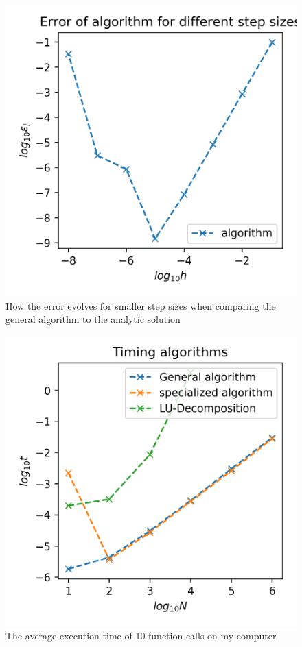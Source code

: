 \documentclass[10pt,showpacs,preprintnumbers,footinbib,amsmath,amssymb,aps,prl,twocolumn,groupedaddress,superscriptaddress,showkeys]{revtex4-1}
\begin{document}
  \begin{figure}[h!]
    \center
    \includegraphics[scale=.7]{figs/ex1e_err.png}
    \caption{How the error evolves for smaller step sizes when comparing the general algorithm to the analytic solution}
    \label{fig:error}
  \end{figure}

  \newpage

  \begin{figure}[h!]
    \center
    \includegraphics[scale=.7]{figs/ex1d_time.png}
    \caption{The average execution time of 10 function calls on my computer}
    \label{fig:time}
  \end{figure}
\end{document}
